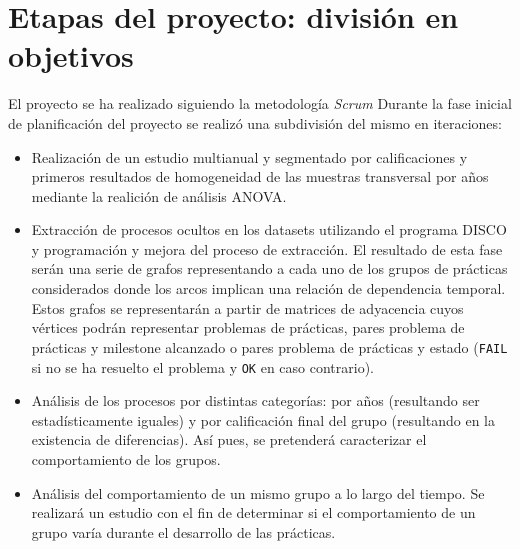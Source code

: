 \chapter{Etapas del proyecto: división en objetivos}\label{chapter:objetivos}

El proyecto se ha realizado siguiendo la metodología \emph{Scrum}
Durante la fase inicial de planificación del proyecto se realizó una subdivisión del mismo en iteraciones:
\begin{itemize}
\item Realización de un estudio multianual y segmentado por calificaciones y primeros resultados de homogeneidad de las muestras transversal por años mediante la realición de análisis ANOVA.
\item Extracción de procesos ocultos en los datasets utilizando el programa DISCO y programación y mejora del proceso de extracción. El resultado de esta fase serán una serie de grafos representando a cada uno de los grupos de prácticas considerados donde los arcos implican una relación de dependencia temporal. Estos grafos se representarán a partir de matrices de adyacencia cuyos vértices podrán representar problemas de prácticas, pares problema de prácticas y milestone alcanzado o pares problema de prácticas y estado (\texttt{FAIL} si no se ha resuelto el problema y \texttt{OK} en caso contrario).
\item Análisis de los procesos por distintas categorías: por años (resultando ser estadísticamente iguales) y por calificación final del grupo (resultando en la existencia de diferencias). Así pues, se pretenderá caracterizar el comportamiento de los grupos.
\item Análisis del comportamiento de un mismo grupo a lo largo del tiempo. Se realizará un estudio con el fin de determinar si el comportamiento de un grupo varía durante el desarrollo de las prácticas.
\end{itemize}